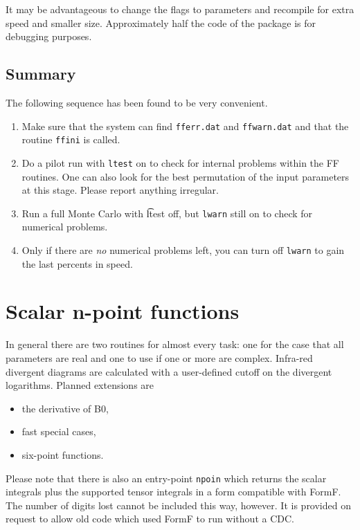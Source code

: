 It may be advantageous to change the flags to parameters and recompile for 
extra speed and smaller size.  Approximately half the code of the package is 
for debugging purposes.

\subsection{Summary}

The following sequence has been found to be very convenient.
\begin{enumerate}
\item Make sure that the system can find {\tt fferr.dat} and {\tt ffwarn.dat} 
and that the routine {\tt ffini} is called.
\item Do a pilot run with {\tt ltest} on to check for internal problems within 
the FF routines.  One can also look for the best permutation of the input 
parameters at this stage.  Please report anything irregular.
\item Run a full Monte Carlo with {\t ltest} off, but {\tt lwarn} still on to 
check for numerical problems.
\item Only if there are {\em no} numerical problems left, you can turn off 
{\tt lwarn} to gain the last percents in speed.
\end{enumerate}

\section{Scalar n-point functions}
\label{sc:n-point}

In general there are two routines for almost every task: one for the case that 
all parameters are real and one to use if one or more are complex.  Infra-red 
divergent diagrams are calculated with a user-defined cutoff on the divergent
logarithms.  Planned extensions are
\begin{itemize}
\item the derivative of B0,
\item fast special cases,
\item six-point functions.
\end{itemize}
Please note that there is also an entry-point {\tt npoin} which returns the 
scalar integrals plus the supported tensor integrals in a form compatible with 
FormF\null.  The number of digits lost cannot be included this way, however.  
It is provided on request to allow old code which used FormF to run without a 
CDC.

